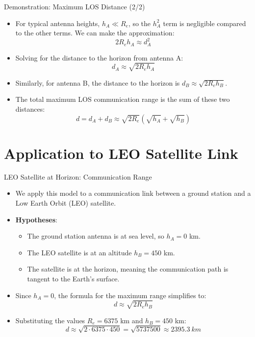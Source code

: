 \documentclass{beamer}
\begin{document}
	\begin{frame}{Demonstration: Maximum LOS Distance (2/2)}
		\begin{itemize}
			\item For typical antenna heights, $h_A \ll R_e$, so the $h_A^2$ term is negligible compared to the other terms. We can make the approximation:
			\[ 2R_e h_A \approx d_A^2 \]
			\item Solving for the distance to the horizon from antenna A:
			\[ d_A \approx \sqrt{2 R_e h_A} \]
			\item Similarly, for antenna B, the distance to the horizon is $d_B \approx \sqrt{2 R_e h_B}$.
			\item The total maximum LOS communication range is the sum of these two distances:
			\vspace{-1em}
			\[ d = d_A + d_B \approx \sqrt{2 R_e} (\sqrt{h_A} + \sqrt{h_B}) \]
		\end{itemize}
	\end{frame}
	
	\section{Application to LEO Satellite Link}
	
	\begin{frame}{LEO Satellite at Horizon: Communication Range}
		\begin{itemize}
			\item We apply this model to a communication link between a ground station and a Low Earth Orbit (LEO) satellite.
			\item \textbf{Hypotheses}:
			\begin{itemize}
				\item The ground station antenna is at sea level, so $h_A = 0$ km.
				\item The LEO satellite is at an altitude $h_B = 450$ km.
				\item The satellite is at the horizon, meaning the communication path is tangent to the Earth's surface.
			\end{itemize}
			\item Since $h_A = 0$, the formula for the maximum range simplifies to:
			\[ d \approx \sqrt{2 R_e h_B} \]
			\item Substituting the values $R_e = 6375$ km and $h_B = 450$ km:
			\vspace{-1em}
			\[ d \approx \sqrt{2 \cdot 6375 \cdot 450} = \sqrt{5737500} \approx \SI{2395.3}{km} \]
		\end{itemize}
	\end{frame}
	
\end{document}

